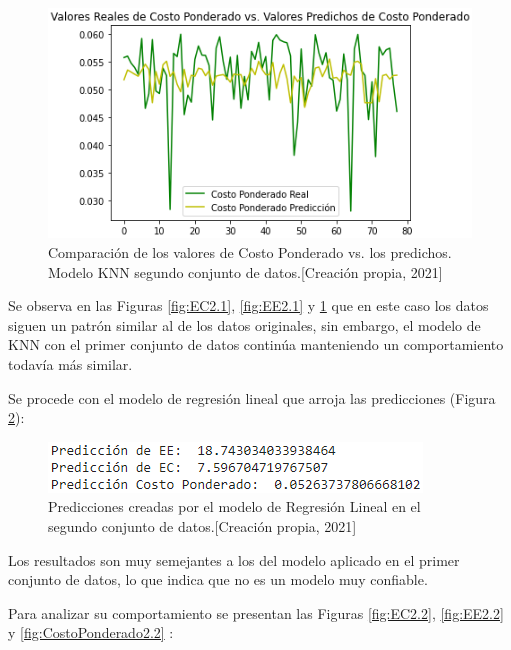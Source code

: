 \documentclass{article}
\begin{document}
\begin{figure}[!h]
    \centering
    \includegraphics[scale=.7]{F4/F4-im17.PNG}
    \caption{Comparación de los valores de Costo Ponderado vs. los predichos. Modelo KNN segundo conjunto de datos.[Creación propia, 2021]}
    \label{fig:CostoPonderado2.1}
\end{figure}
\pagebreak
Se observa en las Figuras \ref{fig:EC2.1}, \ref{fig:EE2.1} y \ref{fig:CostoPonderado2.1} que en este caso los datos siguen un patrón similar al de los datos originales, sin embargo, el modelo de KNN con el primer conjunto de datos continúa manteniendo un comportamiento todavía más similar.


Se procede con el modelo de regresión lineal que arroja las predicciones (Figura \ref{fig:predicciones2.2}): 
\begin{figure}[!h]
    \centering
    \includegraphics[scale=.7]{F4/F4-im18.PNG}
    \caption{Predicciones creadas por el modelo de Regresión Lineal en el segundo conjunto de datos.[Creación propia, 2021]}
    \label{fig:predicciones2.2}
\end{figure}


Los resultados son muy semejantes a los del modelo aplicado en el primer conjunto de datos, lo que indica que no es un modelo muy confiable. 

Para analizar su comportamiento se presentan las Figuras \ref{fig:EC2.2}, \ref{fig:EE2.2} y \ref{fig:CostoPonderado2.2} : \pagebreak
\end{document}
